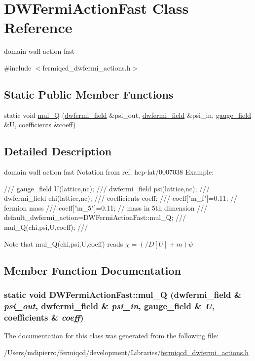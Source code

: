 \hypertarget{class_d_w_fermi_action_fast}{
\section{DWFermiActionFast Class Reference}
\label{class_d_w_fermi_action_fast}
}


domain wall action fast  


{\ttfamily \#include $<$fermiqcd\_\-dwfermi\_\-actions.h$>$}\subsection*{Static Public Member Functions}
\begin{DoxyCompactItemize}
\item 
static void \hyperlink{class_d_w_fermi_action_fast_a52079bb2144dc7ef2f61c4916f9569ca}{mul\_\-Q} (\hyperlink{classdwfermi__field}{dwfermi\_\-field} \&psi\_\-out, \hyperlink{classdwfermi__field}{dwfermi\_\-field} \&psi\_\-in, \hyperlink{classgauge__field}{gauge\_\-field} \&U, \hyperlink{classcoefficients}{coefficients} \&coeff)
\end{DoxyCompactItemize}


\subsection{Detailed Description}
domain wall action fast Notation from ref. hep-\/lat/0007038 Example: \begin{DoxyVerb}
/// gauge_field U(lattice,nc);
/// dwfermi_field psi(lattice,nc);
/// dwfermi_field chi(lattice,nc);
/// coefficients coeff;
/// coeff["m_f"]=0.11; // fermion mass
/// coeff["m_5"]=0.11; // mass in 5th dimension
/// default_dwfermi_action=DWFermiActionFast::mul_Q;
/// mul_Q(chi,psi,U,coeff);
/// \end{DoxyVerb}
 Note that mul\_\-Q(chi,psi,U,coeff) reads $ \chi=(/\!\!\!D[U]+m)\psi $ 

\subsection{Member Function Documentation}
\hypertarget{class_d_w_fermi_action_fast_a52079bb2144dc7ef2f61c4916f9569ca}{
\subsubsection[{mul\_\-Q}]{\setlength{\rightskip}{0pt plus 5cm}static void DWFermiActionFast::mul\_\-Q ({\bf dwfermi\_\-field} \& {\em psi\_\-out}, \/  {\bf dwfermi\_\-field} \& {\em psi\_\-in}, \/  {\bf gauge\_\-field} \& {\em U}, \/  {\bf coefficients} \& {\em coeff})}}
\label{class_d_w_fermi_action_fast_a52079bb2144dc7ef2f61c4916f9569ca}


The documentation for this class was generated from the following file:\begin{DoxyCompactItemize}
\item 
/Users/mdipierro/fermiqcd/development/Libraries/\hyperlink{fermiqcd__dwfermi__actions_8h}{fermiqcd\_\-dwfermi\_\-actions.h}\end{DoxyCompactItemize}
